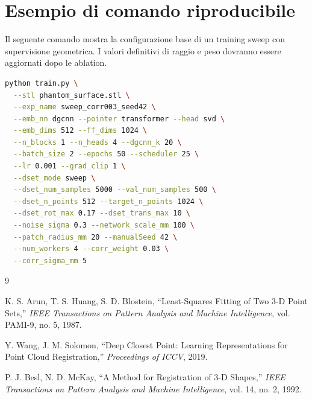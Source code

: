 \documentclass[11pt,a4paper]{article}
\begin{document}
\section{Esempio di comando riproducibile}

Il seguente comando mostra la configurazione base di un training sweep con
supervisione geometrica. I valori definitivi di raggio e peso dovranno essere
aggiornati dopo le ablation.

\begin{lstlisting}[language=bash]
python train.py \
  --stl phantom_surface.stl \
  --exp_name sweep_corr003_seed42 \
  --emb_nn dgcnn --pointer transformer --head svd \
  --emb_dims 512 --ff_dims 1024 \
  --n_blocks 1 --n_heads 4 --dgcnn_k 20 \
  --batch_size 2 --epochs 50 --scheduler 25 \
  --lr 0.001 --grad_clip 1 \
  --dset_mode sweep \
  --dset_num_samples 5000 --val_num_samples 500 \
  --dset_n_points 512 --target_n_points 1024 \
  --dset_rot_max 0.17 --dset_trans_max 10 \
  --noise_sigma 0.3 --network_scale_mm 100 \
  --patch_radius_mm 20 --manualSeed 42 \
  --num_workers 4 --corr_weight 0.03 \
  --corr_sigma_mm 5
\end{lstlisting}

\begin{thebibliography}{9}

\bibitem{arun1987}
K. S. Arun, T. S. Huang, S. D. Blostein,
``Least-Squares Fitting of Two 3-D Point Sets,''
\emph{IEEE Transactions on Pattern Analysis and Machine Intelligence},
vol. PAMI-9, no. 5, 1987.

\bibitem{wang2019dcp}
Y. Wang, J. M. Solomon,
``Deep Closest Point: Learning Representations for Point Cloud Registration,''
\emph{Proceedings of ICCV}, 2019.

P. J. Besl, N. D. McKay,
``A Method for Registration of 3-D Shapes,''
\emph{IEEE Transactions on Pattern Analysis and Machine Intelligence},
vol. 14, no. 2, 1992.

\end{thebibliography}
\end{document}
